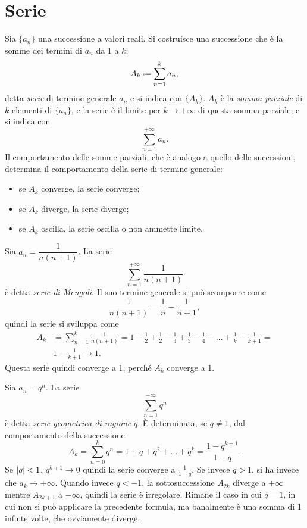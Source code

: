 \chapter{Serie}
Sia $\{a_n\}$ una successione a valori reali. Si costruisce una successione che è la somme dei termini di $a_n$ da 1 a $k$:
\[
A_k\defeq\sum_{n=1}^k a_n,
\]
detta \emph{serie} di termine generale $a_n$ e si indica con $\{A_k\}$. $A_k$ è la \emph{somma parziale} di $k$ elementi di $\{a_n\}$, e la serie è il limite per $k\to+\infty$ di questa somma parziale, e si indica con
\[
\sum_{n=1}^{+\infty}a_n.
\]
Il comportamento delle somme parziali, che è analogo a quello delle successioni, determina il comportamento della serie di termine generale:
\begin{itemize}
\item se $A_k$ converge, la serie converge;
\item se $A_k$ diverge, la serie diverge;
\item se $A_k$ oscilla, la serie oscilla o non ammette limite.
\end{itemize}
\begin{esempio} \label{es:serie-mengoli}
	Sia $a_n=\dfrac1{n(n+1)}$. La serie
	\[
	\sum_{n=1}^{+\infty}\frac1{n(n+1)}
	\]
	è detta \emph{serie di Mengoli}. Il suo termine generale si può scomporre come
	\[
	\frac1{n(n+1)}=\frac1{n}-\frac1{n+1},
	\]
	quindi la serie si sviluppa come
	\[
	\begin{split}
	A_k&=\sum_{n=1}^k\frac1{n(n+1)}=1-\frac12+\frac12-\frac13+\frac13-\frac14-\dots+\frac1{k}-\frac1{k+1}=\\
	&1-\frac1{k+1}\to 1.
	\end{split}
	\]
	Questa serie quindi converge a 1, perché $A_k$ converge a 1.
\end{esempio}
\begin{esempio} \label{es:serie-geometrica}
	Sia $a_n=q^n$. La serie
	\[
	\sum_{n=1}^{+\infty}q^n
	\]
	è detta \emph{serie geometrica di ragione} $q$. È determinata, se $q\neq 1$, dal comportamento della successione
	\[
	A_k=\sum_{n=0}^kq^n=1+q+q^2+\dots+q^k=\frac{1-q^{k+1}}{1-q}.
	\]
	Se $\lvert q\rvert<1$, $q^{k+1}\to 0$ quindi la serie converge a $\frac1{1-q}$. Se invece $q>1$, si ha invece che $a_k\to+\infty$.
	Quando invece $q<-1$, la sottosuccessione $A_{2k}$ diverge a $+\infty$ mentre $A_{2k+1}$ a $-\infty$, quindi la serie è irregolare.
	Rimane il caso in cui $q=1$, in cui non si può applicare la precedente formula, ma banalmente è una somma di 1 infinte volte, che ovviamente diverge.
\end{esempio}

